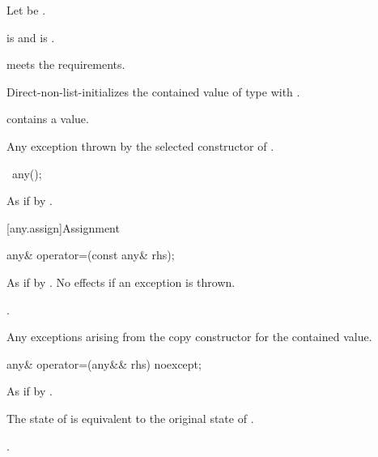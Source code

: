 \begin{itemdescr}
\pnum
Let  be .

\pnum
\constraints
{} is  and
 is .

\pnum
\expects
{} meets the  requirements.

\pnum
\effects
Direct-non-list-initializes the contained value of type 
with .

\pnum
\ensures
{} contains a value.

\pnum
\throws
Any exception thrown by the selected constructor of .
\end{itemdescr}

\begin{itemdecl}
~any();
\end{itemdecl}

\begin{itemdescr}
\pnum
\effects
As if by .
\end{itemdescr}

[any.assign]{Assignment}

%
\begin{itemdecl}
any& operator=(const any& rhs);
\end{itemdecl}

\begin{itemdescr}
\pnum
\effects
As if by .
No effects if an exception is thrown.

\pnum
\returns
{}.

\pnum
\throws
Any exceptions arising from the copy constructor for the contained value.
\end{itemdescr}

%
\begin{itemdecl}
any& operator=(any&& rhs) noexcept;
\end{itemdecl}

\begin{itemdescr}
\pnum
\effects
As if by .

\pnum
\ensures
The state of  is equivalent to the original state of .

\pnum
\returns
{}.
\end{itemdescr}

